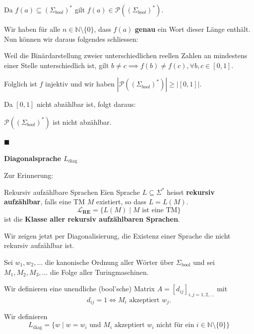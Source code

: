 \documentclass[a4paper, 11pt]{article}
\def\N{\mathbb{N}}
\begin{document}
                Da $f(a) \subseteq (\Sigma_{bool})^*$ gilt $f(a) \in \mathcal{P}((\Sigma_{bool})^*)$.
            
                Wir haben für alle $n \in \N \setminus\{0\}$, dass $f(a)$ \textbf{genau} ein Wort dieser Länge enthält. Nun können wir daraus folgendes schliessen:
            
                Weil die Binärdarstellung zweier unterschiedlichen reellen Zahlen an mindestens einer Stelle unterschiedlich ist, gilt $b \neq c \implies f(b) \neq f(c), \forall b,c \in [0, 1]$. 
            
                Folglich ist $f$ injektiv und wir haben $|\mathcal{P}((\Sigma_{bool})^*)| \geq |[0, 1]|$.
            
                Da $[0,1]$ nicht abzählbar ist, folgt daraus:
            
                $\mathcal{P}((\Sigma_{bool})^*)$ ist nicht abzählbar.
                
                \hspace*{0pt}\hfill$\blacksquare$
        
        
        
            \textbf{Diagonalsprache $L_{\text{diag}}$ }

            Zur Erinnerung:
            \begin{mainbox}{Rekursiv aufzählbare Sprachen}
                Eien Sprache $L \subseteq \Sigma^*$ heisst \textbf{rekursiv aufzählbar}, falls eine TM $M$ existiert, so dass $L = L(M)$.
                $$\mathbf{\mathcal{L}_{\textbf{RE}}} = \{L(M) \mid M \text{ ist eine TM}\}$$
                ist die \textbf{Klasse aller rekursiv aufzählbaren Sprachen}.
            \end{mainbox}
            Wir zeigen jetzt per Diagonalisierung, die Existenz einer Sprache die nicht rekursiv aufzählbar ist.
        
        
            Sei $w_1, w_2,...$ die kanonische Ordnung aller Wörter über $\Sigma_{\text{bool}}$ und sei $M_1, M_2, M_3,...$ die Folge aller Turingmaschinen.
            
            Wir definieren eine unendliche (bool'sche) Matrix $A = [d_{ij}]_{i,j = 1, 2, ...}$ mit 
            $$d_{ij} = 1 \iff M_i \text{ akzeptiert }w_j.$$
        
            Wir definieren
            $$L_{\text{diag}} = \{w \mid w = w_i \text{ und $M_i$ akzeptiert $w_i$ nicht für ein $i \in \N\setminus\{0\}$}\}$$
        
\end{document}
